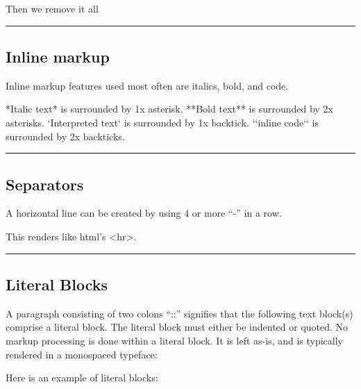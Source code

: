 \documentclass[letterpaper,10pt,english]{sphinxmanual}
\begin{document}
Then we remove it all


\bigskip\hrule\bigskip



\subsection{Inline markup}
\label{\detokenize{guide/99_rst-guide:inline-markup}}
Inline markup features used most often are italics, bold, and code.

\begin{sphinxVerbatim}[commandchars=\\\{\}]
*Italic text* is surrounded by 1x asterisk.
**Bold text** is surrounded by 2x asterisks.
{}`Interpreted text{}` is surrounded by 1x backtick.
{}`{}`inline code{}`{}` is surrounded by 2x backticks.
\end{sphinxVerbatim}


\bigskip\hrule\bigskip



\subsection{Separators}
\label{\detokenize{guide/99_rst-guide:separators}}
A horizontal line can be created by using 4 or more “-” in a row.

\begin{sphinxVerbatim}[commandchars=\\\{\}]
\end{sphinxVerbatim}

This renders like html’s \textless{}hr\textgreater{}.


\bigskip\hrule\bigskip



\subsection{Literal Blocks}
\label{\detokenize{guide/99_rst-guide:literal-blocks}}
A paragraph consisting of two colons “::” signifies that the following text block(s) comprise a literal block. The literal block must either be indented or quoted. No markup processing is done within a literal block. It is left as-is, and is typically rendered in a monospaced typeface:

Here is an example of literal blocks:
\end{document}
